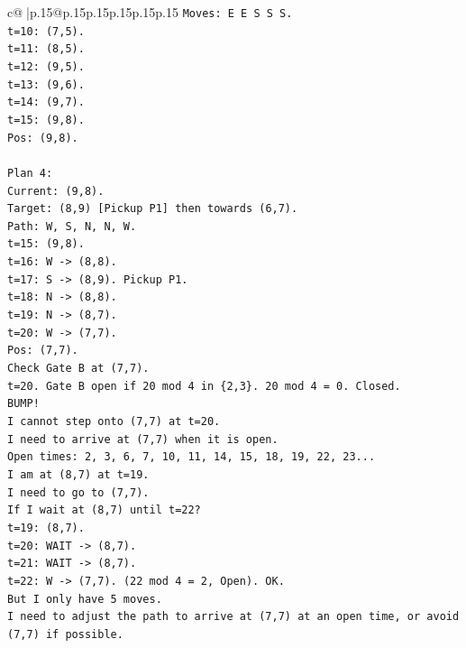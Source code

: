 \documentclass{article}
\begin{document}
{\begin{supertabular}{c@{$\;$}|p{.15\linewidth}@{}p{.15\linewidth}p{.15\linewidth}p{.15\linewidth}p{.15\linewidth}p{.15\linewidth}}
{{{\texttt{Moves: E E S S S.} \\
\texttt{t=10: (7,5).} \\
\texttt{t=11: (8,5).} \\
\texttt{t=12: (9,5).} \\
\texttt{t=13: (9,6).} \\
\texttt{t=14: (9,7).} \\
\texttt{t=15: (9,8).} \\
\texttt{Pos: (9,8).} \\
\\ 
\texttt{Plan 4:} \\
\texttt{Current: (9,8).} \\
\texttt{Target: (8,9) {[}Pickup P1{]} then towards (6,7).} \\
\texttt{Path: W, S, N, N, W.} \\
\texttt{t=15: (9,8).} \\
\texttt{t=16: W {-}> (8,8).} \\
\texttt{t=17: S {-}> (8,9). Pickup P1.} \\
\texttt{t=18: N {-}> (8,8).} \\
\texttt{t=19: N {-}> (8,7).} \\
\texttt{t=20: W {-}> (7,7).} \\
\texttt{Pos: (7,7).} \\
\texttt{Check Gate B at (7,7).} \\
\texttt{t=20. Gate B open if 20 mod 4 in \{2,3\}. 20 mod 4 = 0. Closed.} \\
\texttt{BUMP!} \\
\texttt{I cannot step onto (7,7) at t=20.} \\
\texttt{I need to arrive at (7,7) when it is open.} \\
\texttt{Open times: 2, 3, 6, 7, 10, 11, 14, 15, 18, 19, 22, 23...} \\
\texttt{I am at (8,7) at t=19.} \\
\texttt{I need to go to (7,7).} \\
\texttt{If I wait at (8,7) until t=22?} \\
\texttt{t=19: (8,7).} \\
\texttt{t=20: WAIT {-}> (8,7).} \\
\texttt{t=21: WAIT {-}> (8,7).} \\
\texttt{t=22: W {-}> (7,7). (22 mod 4 = 2, Open). OK.} \\
\texttt{But I only have 5 moves.} \\
\texttt{I need to adjust the path to arrive at (7,7) at an open time, or avoid (7,7) if possible.} \\
}}}
\end{supertabular}}
\end{document}
